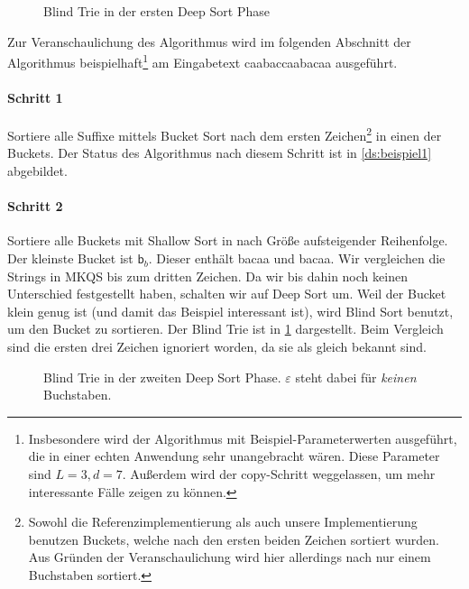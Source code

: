 \newcommand{\tnode}{\node[draw,circle]}
\newcommand{\trans}{\draw[-stealth]}
\begin{figure}[!ht]
\centering
{}
\caption{Blind Trie in der ersten Deep Sort Phase}
\label{ds:beispiel_bt1}
\end{figure}

Zur Veranschaulichung des Algorithmus wird im folgenden Abschnitt der Algorithmus
beispielhaft\footnote{Insbesondere wird der Algorithmus mit Beispiel-Parameterwerten ausgeführt,
die in einer echten Anwendung sehr unangebracht wären. Diese Parameter sind $L = 3, d = 7$. Außerdem wird der copy-Schritt weggelassen, um mehr interessante Fälle zeigen zu können.}
am Eingabetext \glqq caabaccaabacaa\grqq{} ausgeführt.

\paragraph{Schritt 1} Sortiere alle Suffixe mittels Bucket Sort nach dem ersten Zeichen\footnote{Sowohl die Referenzimplementierung als auch unsere Implementierung benutzen Buckets, welche nach den ersten beiden Zeichen sortiert wurden.
Aus Gründen der Veranschaulichung wird hier allerdings nach nur einem Buchstaben sortiert.} in einen der Buckets.
Der Status des Algorithmus nach diesem Schritt ist in \cref{ds:beispiel1} abgebildet.

\paragraph{Schritt 2} Sortiere alle Buckets mit Shallow Sort in nach Größe aufsteigender Reihenfolge.
Der kleinste Bucket ist $\mathsf{b}_b$.
Dieser enthält \glqq bacaa\grqq{} und \glqq bacaa\grqq.
Wir vergleichen die Strings in MKQS bis zum dritten Zeichen.
Da wir bis dahin noch keinen Unterschied festgestellt haben, schalten wir auf Deep Sort um. 
Weil der Bucket klein genug ist (und damit das Beispiel interessant ist), wird Blind Sort benutzt, um den Bucket zu sortieren.
Der Blind Trie ist in \cref{ds:beispiel_bt1} dargestellt.
Beim Vergleich sind die ersten drei Zeichen ignoriert worden, da sie als gleich bekannt sind.

\begin{figure}
\centering
{}
\caption{Blind Trie in der zweiten Deep Sort Phase. $\varepsilon$ steht dabei für \emph{keinen} Buchstaben.}
\label{ds:beispiel_bt2}
\end{figure}

